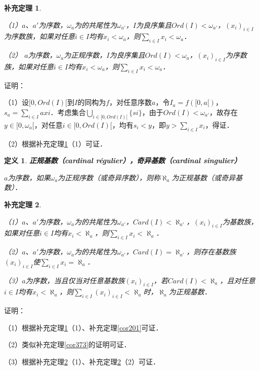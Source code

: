 \documentclass[12pt, a4paper, oneside]{book}
\newtheorem{cor}{补充定理}
\newtheorem{de}{定义}
\begin{document}
			\begin{cor}\label{cor380}
				\hfill\par
				（1）$a$、$a'$为序数，$\omega_a$为的共尾性为$\omega_{a'}$，$I$为良序集且$Ord(I)<\omega_{a'}$，$(x_i)_{i\in I}$为序数族，如果对任意$i\in I$均有$x_i<\omega_a$，则$\sum\limits_{i\in I}x_i<\omega_a$．
				\par
				（2）	$a$为序数，$\omega_a$为正规序数，$I$为良序集且$Ord(I)<\omega_a$，$(x_i)_{i\in I}$为序数族，如果对任意$i\in I$均有$x_i<\omega_a$，则$\sum\limits_{i\in I}x_i<\omega_a$．
			\end{cor}
			证明：
			\par
			（1）设$[0, Ord(I)[$到$I$的同构为$f$，对任意序数$a$，令$I_a=f([0, a[)$，$s_a=\sum\limits_{i\in I}axi$．考虑集合$\bigcup\limits_{i\in [0, Ord(I)[}\{si\}$，由于$Ord(I)<\omega_{a'}$，故存在$y\in [0, \omega_a[$，对任意$i\in [0, Ord(I)[$，均有$s_i<y$，即$y>\sum\limits_{i\in I}x_i$，得证．
			\par
			（2）根据补充定理\ref{cor380}（1）可证．
			
			\begin{de}
				\textbf{正规基数（cardinal régulier），奇异基数（cardinal singulier）}
				\par
				$a$为序数，如果$\omega_a$为正规序数（或奇异序数），则称$\aleph_a$为正规基数（或奇异基数）．
			\end{de}
			
			\begin{cor}\label{cor381}
				\hfill\par
				（1）$a$、$a'$为序数，$\omega_a$为的共尾性为$\omega_{a'}$，$Card(I)<\aleph_{a'}$，$(x_i)_{i\in I}$为基数族，如果对任意$i\in I$均有$x_i<\aleph_a$，则$\sum\limits_{i\in I}x_i<\aleph_a$．
				\par
				（2）$a$、$a'$为序数，$\omega_a$为的共尾性为$\omega_{a'}$，$Card(I)=\aleph_{a'}$，则存在基数族$(x_i)_{i\in I}$使$\sum\limits_{i\in I}x_i=\aleph_a$．
				\par
				（3）$a$为序数，当且仅当对任意基数族$(x_i)_{i\in I}$，若$Card(I)<\aleph_a$，且对任意$i\in I$均有$x_i<\aleph_a$，则$\sum\limits_{i\in I}(x_i)_{i\in I}<\aleph_a$时，$\aleph_a$为正规基数．
			\end{cor}
			证明：
			\par
			（1）根据补充定理\ref{cor380}（1）、补充定理\ref{cor201}可证．
			\par
			（2）类似补充定理\ref{cor373}的证明可证．
			\par
			（3）根据补充定理\ref{cor381}（1）、补充定理\ref{cor381}（2）可证．
			
\end{document}
